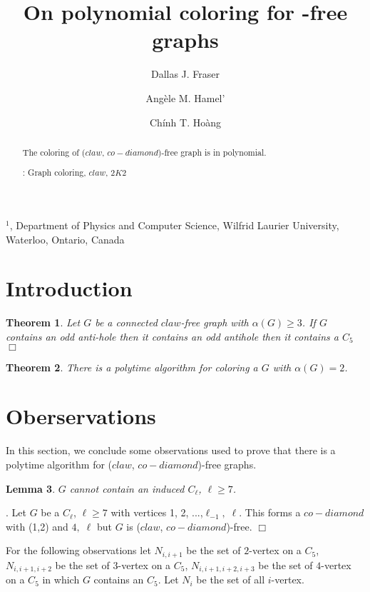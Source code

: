 \documentclass[12pt]{article}
\title{On polynomial coloring for {\CCD}-free graphs}
\author{
	Dallas J. Fraser\inst{1}
	\and Ang\`ele M. Hamel'\inst{1}
	\and Ch\'inh T. Ho\`ang\inst{1}
}
\newtheorem{Theorem}{Theorem}[section]
\newtheorem{Lemma}[Theorem]{Lemma}
\def\inst#1{$^{#1}$}
\def\CCD{($claw$, $co-diamond$)}
\def\VTWO{$N_{i , i+1}$}
\def\VTHREE{$N_{i , i+1, i+2}$}
\def\VFOUR{$N_{i , i+1, i+2, i+3}$}
\begin{document}
\maketitle

\begin{center}
{\footnotesize

\inst{1}, Department of Physics and Computer Science, Wilfrid Laurier
University, \\Waterloo, Ontario, Canada}

\end{center}

\begin{abstract}
The coloring of {\CCD}-free graph is in polynomial.

: Graph coloring, $claw$, $2K2$
\end{abstract}


\section{Introduction}\label{sec:intro}

\begin{Theorem}\label{thm:ben-rebea}
Let $G$ be a connected $claw$-free graph with $\alpha(G) \geq 3$. If $G$ contains an odd anti-hole then it contains an odd antihole then it contains a $C_5$ $\Box$
\end{Theorem}

\begin{Theorem}\label{thm:alpha-two-poly}
There is a polytime algorithm for coloring a $G$ with $\alpha(G) =2$.
 \end{Theorem}

\section{Oberservations}\label{sec:observations}
In this section, we conclude some observations used to prove that there is a polytime algorithm for {\CCD}-free graphs.
\begin{Lemma}\label{lem:odd-hole-free}
$G$ cannot contain an induced $C_\ell$, $\ell \geq 7$.
\end{Lemma}
. Let $G$ be a $C_\ell$, $\ell \geq 7$ with vertices 1, 2, ...,$\ell_{-1},\; \ell$. This forms a $co-diamond$ with (1,2) and $4,\; \ell$  but $G$ is {\CCD}-free. $\Box$

For the following observations let {\VTWO} be the set of $2$-vertex on a $C_5$, {\VTHREE} be the set of $3$-vertex on a $C_5$, {\VFOUR} be the set of $4$-vertex on a $C_5$ in which $G$ contains an $C_5$. Let $N_i$ be the set of all $i$-vertex. 
\end{document}
